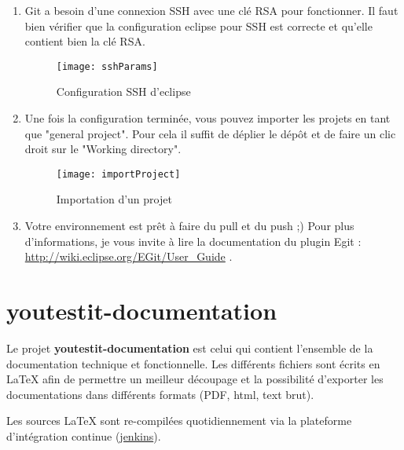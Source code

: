 \begin{enumerate}
	 \item Git a besoin d'une connexion SSH avec une clé RSA pour fonctionner. Il faut
	 bien vérifier que la configuration eclipse pour SSH est correcte et qu'elle contient
	 bien la clé RSA.
		\begin{figure}[!h]
     		\begin{center}
			      \texttt{[image: sshParams]}
			      \caption{Configuration SSH d'eclipse}
			      \label{eclipseSshConfig}
		    \end{center}
		\end{figure}		 
	 
	\item Une fois la configuration terminée, vous pouvez importer les projets en tant que "general project".
	Pour cela il suffit de déplier le dépôt et de faire un clic droit sur le "Working directory".
		\begin{figure}[!h]
     		\begin{center}
			      \texttt{[image: importProject]}
			      \caption{Importation d'un projet}
			      \label{gitProjectImport}
		    \end{center}
		\end{figure}	
		
	\item Votre environnement est prêt à faire du pull et du push ;)   Pour plus  d'informations, je vous invite à lire la
	documentation du plugin Egit : \href{http://wiki.eclipse.org/EGit/User\_Guide}{http://wiki.eclipse.org/EGit/User\_Guide} . 
 
	 
\end{enumerate}

\section{youtestit-documentation}
Le projet \textbf{youtestit-documentation} est celui qui contient l'ensemble de la documentation
technique et fonctionnelle. Les différents fichiers sont écrits en LaTeX afin de permettre un meilleur
découpage et la possibilité d'exporter les documentations dans différents formats (PDF, html, text brut).


Les sources LaTeX sont re-compilées  quotidiennement  via la plateforme d'intégration continue (\href{http://youtestit.org/jenkins/job/youtestit-documentation/}{jenkins}).

